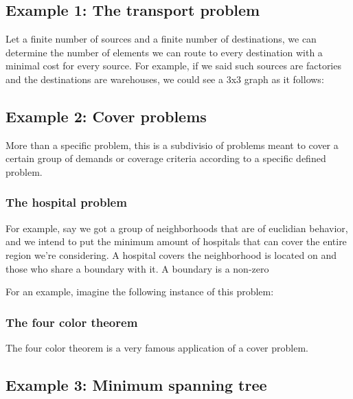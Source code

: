 \documentclass{textbook}
\begin{document}
\subsection{Example 1: The transport problem}

Let a finite number of sources and a finite number of destinations, we can determine the
number of elements we can route to every destination with a minimal cost for every source. 
For example, if we said such sources are factories and the destinations are warehouses, we could see a 3x3
graph as it follows:


\subsection{Example 2: Cover problems}

More than a specific problem, this is a subdivisio of problems meant to cover a certain group of demands
or coverage criteria according to a specific defined problem.

\subsubsection{The hospital problem}

For example, say we got a group of neighborhoods that are of euclidian behavior, and we intend to put the minimum amount of
hospitals that can cover the entire region we're considering. A hospital covers the neighborhood is located on and
those who share a boundary with it. A boundary is a non-zero

For an example, imagine the following instance of this problem:


\subsubsection{The four color theorem}

The four color theorem is a very famous application of a cover problem. 


\subsection{Example 3: Minimum spanning tree}
\end{document}
